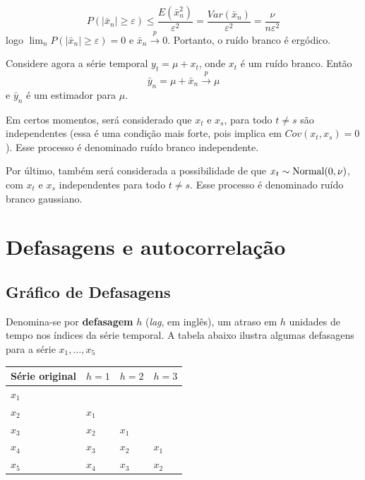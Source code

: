 \documentclass[
  letterpaper,
  DIV=11,
  numbers=noendperiod]{scrartcl}
\newcounter{none} %
\theoremstyle{definition}
\theoremstyle{definition}
\theoremstyle{plain}
\theoremstyle{plain}
\theoremstyle{remark}
\begin{document}
\[P\left(|\bar{x}_n|\geq\varepsilon\right)\leq \frac{E(\bar{x}_n^2)}{\varepsilon^2}=\frac{Var(\bar{x}_n)}{\varepsilon^2}=\frac{\nu}{n\varepsilon^2}\]
logo \(\lim_{n}P(|\bar{x}_n|\geq \varepsilon)=0\) e
\(\bar{x}_n\stackrel{p}{\rightarrow}0\). Portanto, o ruído branco é
ergódico.

Considere agora a série temporal \(y_t=\mu+x_t\), onde \(x_t\) é um
ruído branco. Então
\[\bar{y}_n=\mu+\bar{x}_n\stackrel{p}{\rightarrow}\mu\] e \(\bar{y}_n\)
é um estimador para \(\mu\).

Em certos momentos, será considerado que \(x_t\) e \(x_s\), para todo
\(t\neq s\) são independentes (essa é uma condição mais forte, pois
implica em \(Cov(x_t,x_s)=0\)). Esse processo é denominado ruído branco
independente.

Por último, também será considerada a possibilidade de que
\(x_t\sim\hbox{Normal}(0,\nu)\), com \(x_t\) e \(x_s\) independentes
para todo \(t\neq s\). Esse processo é denominado ruído branco
gaussiano.


\chapter{Defasagens e
autocorrelação}\label{defasagens-e-autocorrelauxe7uxe3o}

\section{Gráfico de Defasagens}\label{gruxe1fico-de-defasagens}

Denomina-se por \textbf{defasagem} \(h\) (\emph{lag}, em inglês), um
atraso em \(h\) unidades de tempo nos índices da série temporal. A
tabela abaixo ilustra algumas defasagens para a série \(x_1,\ldots,x_5\)

{\def\LTcaptype{none} %
\begin{longtable}[]{@{}llll@{}}
\toprule\noalign{}
Série original & \(h=1\) & \(h=2\) & \(h=3\) \\
\midrule\noalign{}
\endhead
\bottomrule\noalign{}
\endlastfoot
\(x_1\) & & & \\
\(x_2\) & \(x_1\) & & \\
\(x_3\) & \(x_2\) & \(x_1\) & \\
\(x_4\) & \(x_3\) & \(x_2\) & \(x_1\) \\
\(x_5\) & \(x_4\) & \(x_3\) & \(x_2\) \\
\end{longtable}
}
\end{document}
